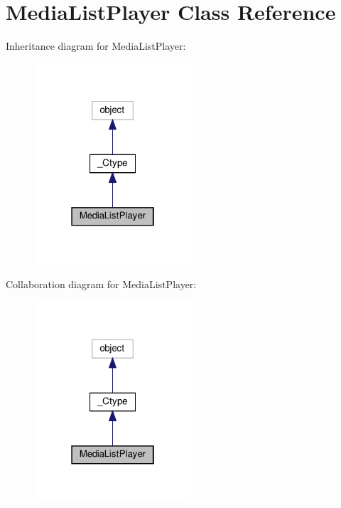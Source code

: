 \hypertarget{classvlc_1_1_media_list_player}{}\section{Media\+List\+Player Class Reference}
\label{classvlc_1_1_media_list_player}


Inheritance diagram for Media\+List\+Player\+:
\nopagebreak
\begin{figure}[H]
\begin{center}
\leavevmode
\includegraphics[width=166pt]{classvlc_1_1_media_list_player__inherit__graph}
\end{center}
\end{figure}


Collaboration diagram for Media\+List\+Player\+:
\nopagebreak
\begin{figure}[H]
\begin{center}
\leavevmode
\includegraphics[width=166pt]{classvlc_1_1_media_list_player__coll__graph}
\end{center}
\end{figure}
